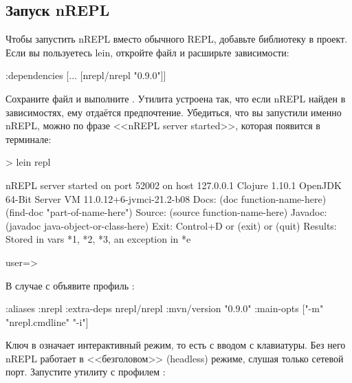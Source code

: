 \subsection{Запуск nREPL}

Чтобы запустить nREPL вместо обычного REPL, добавьте библиотеку в проект. Если вы пользуетесь lein, откройте файл  и расширьте зависимости:

\begin{english}
  \begin{clojure}
{:dependencies
 [... [nrepl/nrepl "0.9.0"]]}
  \end{clojure}
\end{english}


Сохраните файл и выполните . Утилита  устроена так, что если nREPL найден в зависимостях, ему отдаётся предпочтение. Убедиться, что вы запустили именно nREPL, можно по фразе <<nREPL server started>>, которая появится в терминале:

\begin{english}
  \begin{text}
> lein repl

nREPL server started on port 52002 on host 127.0.0.1
Clojure 1.10.1
OpenJDK 64-Bit Server VM 11.0.12+6-jvmci-21.2-b08
    Docs: (doc function-name-here)
          (find-doc "part-of-name-here")
  Source: (source function-name-here)
 Javadoc: (javadoc java-object-or-class-here)
    Exit: Control+D or (exit) or (quit)
 Results: Stored in vars *1, *2, *3, an exception in *e

user=>
  \end{text}
\end{english}

В случае с  объявите профиль :

\begin{english}
  \begin{clojure/lines}
{:aliases
 {:nrepl
  {:extra-deps
   {nrepl/nrepl {:mvn/version "0.9.0"}}
   :main-opts ["-m" "nrepl.cmdline" "-i"]}}}
  \end{clojure/lines}
\end{english}

Ключ  в   означает интерактивный режим, то есть с вводом с клавиатуры. Без него nREPL работает в <<безголовом>> (headless) режиме, слушая только сетевой порт. Запустите утилиту  с профилем :

